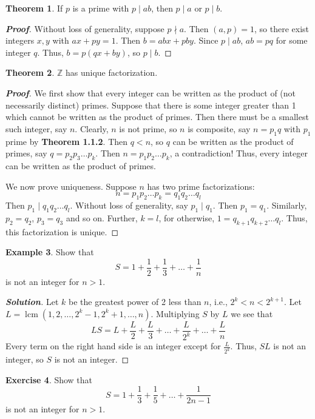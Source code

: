 \documentclass[12pt,leqno]{book}
\numberwithin{equation}{section}
\theoremstyle{definition}
\newtheorem{thm}{Theorem}[section]
\newtheorem{exer}[thm]{Exercise}
\newtheorem{ex}[thm]{Example}
\newcommand{\lcm}{\operatorname{lcm}}
\newenvironment{Proof}{\begin{proof}[\textnormal{\textbf{Proof}}]}{\end{proof}}
\newenvironment{Solution}{\begin{proof}[\textnormal{\textbf{Solution}}]}{\end{proof}}
\begin{document}
\begin{thm}
 If $p$ is a prime with $p\mid ab$, then $p\mid a$ or $p\mid b$.
\end{thm}

\begin{Proof}
 Without loss of generality, suppose $p\nmid a$. Then $(a,p)=1$, so there exist integers $x,y$ with $ax+py=1$. Then $b=abx+pby$. Since $p\mid ab$, $ab=pq$ for some integer $q$. Thus, $b=p(qx+by)$, so $p\mid b$.
\end{Proof}

\begin{thm}
 $\mathbb{Z}$ has unique factorization.
\end{thm}

\begin{Proof}
 We first show that every integer can be written as the product of (not necessarily distinct) primes. Suppose that there is some integer greater than 1 which cannot be written as the product of primes. Then there must be a smallest such integer, say $n$. Clearly, $n$ is not prime, so $n$ is composite, say $n=p_1q$ with $p_1$ prime by \textbf{Theorem 1.1.2}. Then $q<n$, so $q$ can be written as the product of primes, say $q=p_2p_3\hdots p_k$. Then $n=p_1p_2\hdots p_k$, a contradiction! Thus, every integer can be written as the product of primes.

We now prove uniqueness. Suppose $n$ has two prime factorizations: \[n=p_1p_2\hdots p_k=q_1q_2\hdots q_l\] Then $p_1\mid q_1q_2\hdots q_l$. Without loss of generality, say $p_1\mid q_1$. Then $p_1=q_1$. Similarly, $p_2=q_2$, $p_3=q_3$ and so on. Further, $k=l$, for otherwise, $1=q_{k+1}q_{k+2}\hdots q_l$. Thus, this factorization is unique.
\end{Proof}

\begin{ex}
 Show that \[S=1+\frac{1}{2}+\frac{1}{3}+\hdots+\frac{1}{n}\] is not an integer for $n>1$.
\end{ex}

\begin{Solution}
 Let $k$ be the greatest power of 2 less than $n$, i.e., $2^k<n<2^{k+1}$. Let $L=\lcm\left(1,2,\hdots,2^k-1,2^k+1,\hdots,n\right)$. Multiplying $S$ by $L$ we see that \[LS=L+\frac{L}{2}+\frac{L}{3}+\hdots+\frac{L}{2^k}+\hdots+\frac{L}{n}\] Every term on the right hand side is an integer except for $\frac{L}{2^k}$. Thus, $SL$ is not an integer, so $S$ is not an integer.
\end{Solution}

\begin{exer}
 Show that \[S=1+\frac{1}{3}+\frac{1}{5}+\hdots+\frac{1}{2n-1}\] is not an integer for $n>1$. 
\end{exer}
\end{document}

